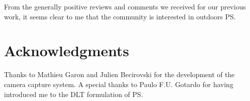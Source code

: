 \documentclass{report}
\begin{document}
From the generally positive reviews and comments we received for our previous work, it seems clear to me that the community is interested in outdoors PS.




\chapter*{Acknowledgments}

Thanks to Mathieu Garon and Julien Becirovski for the development of the camera capture system.
A special thanks to Paulo F.U. Gotardo for having introduced me to the DLT formulation of PS.


%

{\small


}
\end{document}
